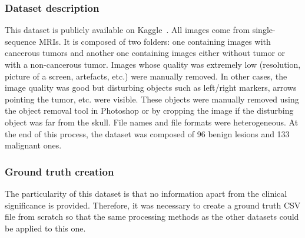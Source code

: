 \subsubsection{Dataset description}
\setlength{\marginparwidth}{3cm}\leavevmode {}This dataset is publicly available on Kaggle~\cite{51}. All images come from single-sequence MRIs. It is composed of two folders: one containing images with cancerous tumors and another one containing images either without tumor or with a non-cancerous tumor. Images whose quality was extremely low (resolution, picture of a screen, artefacts, etc.) were manually removed. In other cases, the image quality was good but disturbing objects such as left/right markers, arrows pointing the tumor, etc. were visible. These objects were manually removed using the object removal tool in Photoshop or by cropping the image if the disturbing object was far from the skull. File names and file formats were heterogeneous. At the end of this process, the dataset was composed of 96 benign lesions and 133 malignant ones.


\subsubsection{Ground truth creation}
\label{sec:braingroundtruth}
\setlength{\marginparwidth}{3cm}\leavevmode {}The particularity of this dataset is that no information apart from the clinical significance is provided. Therefore, it was necessary to create a ground truth CSV file from scratch so that the same processing methods as the other datasets could be applied to this one.

